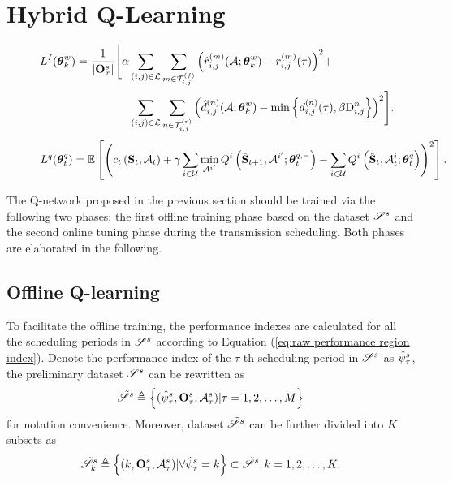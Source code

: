 \section{Hybrid Q-Learning}
\label{sec:Hybrid Q-Learning}
\begin{figure*}[!t]
   \normalsize
   \begin{align}
      \label{eq: imitator loss}
      L^I(\boldsymbol{\theta}^w_k) = \frac{1}{|\mathbf{O}^{s}_{\tau}|} \Bigg[
         \alpha
         &\sum_{(i,j) \in{\mathcal{L}}} \sum_{{m} \in{\mathcal{T}_{i,j}^{(f)}}}
         {\left(\hat{r}_{i,j}^{(m)}(\mathcal{A}; \boldsymbol{\theta}^w_k) - r_{i,j}^{(m)}(\tau)\right)}^2
         +
         \nonumber\\
         &\sum_{(i,j) \in{\mathcal{L}}} \sum_{{n} \in{\mathcal{T}_{i,j}^{(r)}}}
         {\left(
            \hat{d}_{i,j}^{(n)}(\mathcal{A}; \boldsymbol{\theta}^w_k)
            -
            \min \left\{
            d_{i,j}^{(n)}(\tau), \beta \mathrm{D}^{n}_{i,j}
            \right\}
         \right)}^2
         \Bigg].
   \end{align}
   \begin{align}
      \label{eq:loss}
      L^q(\boldsymbol{\theta}^q_t) = \mathbb{E} \left[
         {\left( c_t\left(\mathbf{S}_t,\mathcal{A}_t\right)
         + \gamma \sum_{{i} \in \mathcal{U}}
         \min_{\mathcal{A}^{i'}}
         Q^{i} \left( \hat{\mathbf{S}}_{t+1}, \mathcal{A}^{i'}; \boldsymbol{\theta}^{q,-}_t \right)
         - \sum_{{i} \in \mathcal{U}}
         Q^{i} \left(
         \hat{\mathbf{S}}_t, \mathcal{A}^{i}_t; \boldsymbol{\theta}^q_t
         \right)
         \right)}^2
         \right].
   \end{align}
   \hrulefill{}
\end{figure*}

The Q-network proposed in the previous section should be trained via the following two phases: the first offline training phase based on the dataset $\mathscr{S}^{s}$ and the second online tuning phase during the transmission scheduling. Both phases are elaborated in the following.


\subsection{Offline Q-learning}  

To facilitate the offline training, the performance indexes are calculated for all the scheduling periods in $\mathscr{S}^{s}$ according to Equation (\ref{eq:raw performance region index}). Denote the performance index of the $\tau$-th scheduling period in $\mathscr{S}^{s}$ as $\hat{\psi}_\tau^s$, the preliminary dataset $\mathscr{S}^{s}$ can be rewritten as
\begin{equation}
   \Tilde{\mathscr{S}}^{s}  \triangleq
   \left\{
   (\hat{\psi}_\tau^s, \mathbf{O}_{\tau}^s, \mathcal{A}^s_{\tau})
   |
   \tau = 1, 2, \ldots, M
   \right\}
\end{equation}
for notation convenience. Moreover, dataset $\Tilde{\mathscr{S}}^{s}$ can be further divided into $K$ subsets as
\begin{equation}
   \Tilde{\mathscr{S}}^{s}_k
   \triangleq \left\{
   (k, \mathbf{O}_{\tau}^s, \mathcal{A}^s_{\tau})
   |
   \forall \hat{\psi}_\tau^s = k
   \right\}
   \subset
   \Tilde{\mathscr{S}}^{s}, k = 1, 2, \ldots, K.
\end{equation}

